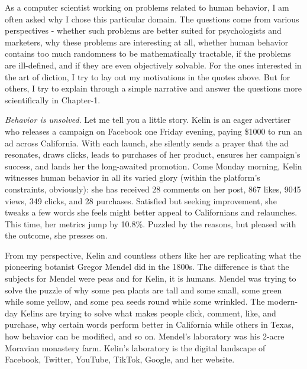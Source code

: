\documentclass[PhD]{iiitd}
\begin{document}
As a computer scientist working on problems related to human behavior, I am often asked why I chose this particular domain. The questions come from various perspectives - whether such problems are better suited for psychologists and marketers, why these problems are interesting at all, whether human behavior contains too much randomness to be mathematically tractable, if the problems are ill-defined, and if they are even objectively solvable. For the ones interested in the art of diction, I try to lay out my motivations in the quotes above. But for others, I try to explain through a simple narrative and answer the questions more scientifically in Chapter-1. 



\textit{Behavior is unsolved}. Let me tell you a little story. Kelin is an eager advertiser who releases a campaign on Facebook one Friday evening, paying \$1000 to run an ad across California. With each launch, she silently sends a prayer that the ad resonates, draws clicks, leads to purchases of her product, ensures her campaign's success, and lands her the long-awaited promotion. Come Monday morning, Kelin witnesses human behavior in all its varied glory (within the platform's constraints, obviously): she has received 28 comments on her post, 867 likes, 9045 views, 349 clicks, and 28 purchases. Satisfied but seeking improvement, she tweaks a few words she feels might better appeal to Californians and relaunches. This time, her metrics jump by 10.8\%. Puzzled by the reasons, but pleased with the outcome, she presses on.


From my perspective, Kelin and countless others like her are replicating what the pioneering botanist Gregor Mendel did in the 1800s. The difference is that the subjects for Mendel were peas and for Kelin, it is humans. Mendel was trying to solve the puzzle of why some pea plants are tall and some small, some green while some yellow, and some pea seeds round while some wrinkled. The modern-day Kelins are trying to solve what makes people click, comment, like, and purchase, why certain words perform better in California while others in Texas, how behavior can be modified, and so on. Mendel's laboratory was his 2-acre Moravian monastery farm. Kelin's laboratory is the digital landscape of Facebook, Twitter, YouTube, TikTok, Google, and her website. 
\end{document}
